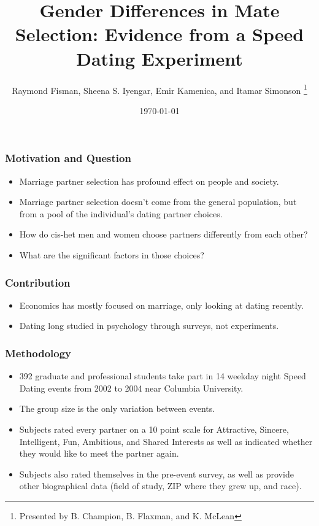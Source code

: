 \documentclass[handout,xcolor=pdftex,dvipsnames,table]{beamer}
\title{Gender Differences in Mate Selection: Evidence from a Speed Dating Experiment}
\author{Raymond Fisman, Sheena S. Iyengar, Emir Kamenica, and Itamar Simonson \thanks{Presented by B. Champion, B. Flaxman, and K. McLean}}
\date{\today}
\begin{document}
\maketitle

\begin{frame} \frametitle{Motivation and Question}
     \begin{itemize}
        \item Marriage partner selection has profound effect on people and society. \pause
        \item Marriage partner selection doesn't come from the general population, but from a pool of the individual's dating partner choices. \pause
        \item How do cis-het men and women choose partners differently from each other?  \pause
        \item What are the significant factors in those choices?
    \end{itemize}
\end{frame}

\begin{frame} \frametitle{Contribution}
     \begin{itemize}
        \item Economics has mostly focused on marriage, only looking at dating recently.\pause
        \item Dating long studied in psychology through surveys, not experiments.
    \end{itemize}
\end{frame}


\begin{frame} \frametitle{Methodology}
     \begin{itemize}
        \item 392 graduate and professional students take part in 14 weekday night Speed Dating events from 2002 to 2004 near Columbia University. \pause
        \item The group size is the only variation between events. \pause
        \item Subjects rated every partner on a 10 point scale for Attractive, Sincere, Intelligent, Fun, Ambitious, and Shared Interests as well as indicated whether they would like to meet the partner again. \pause
        \item Subjects also rated themselves in the pre-event survey, as well as provide other biographical data (field of study, ZIP where they grew up, and race).
    \end{itemize}
\end{frame}
\end{document}
